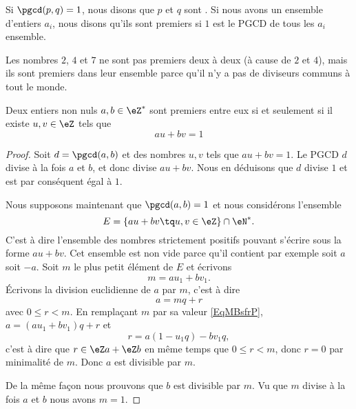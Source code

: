 \begin{definition}
    Si \( \pgcd(p,q)=1\), nous disons que \( p\) et \( q\) sont . Si nous avons un ensemble d'entiers \( a_i\), nous disons qu'ils sont premiers  si \( 1\) est le PGCD de tous les \( a_i\) ensemble.
\end{definition}

Les nombres \( 2\), \( 4\) et \( 7\) ne sont pas premiers deux à deux (à cause de \( 2\) et \( 4\)), mais ils sont premiers dans leur ensemble parce qu'il n'y a pas de diviseurs communs à tout le monde.

\begin{theorem} \label{ThoBuNjam}   
    Deux entiers non nuls \( a,b\in\eZ^*\) sont premiers entre eux si et seulement si il existe \( u,v\in\eZ\) tels que 
    \begin{equation}
        au+bv=1
    \end{equation}
\end{theorem}

\begin{proof}
    Soit \( d=\pgcd(a,b)\) et des nombres \( u,v\) tels que \( au+bv=1\). Le PGCD \( d\) divise à la fois \( a\) et \( b\), et donc divise \( au+bv\). Nous en déduisons que \( d\) divise \( 1\) et est par conséquent égal à \( 1\).

    Nous supposons maintenant que \( \pgcd(a,b)=1\) et nous considérons l'ensemble
    \begin{equation}
        E=\{ au+bv\tq u,v\in \eZ \}\cap \eN^*.
    \end{equation}
    C'est à dire l'ensemble des nombres strictement positifs pouvant s'écrire sous la forme \( au+bv\). Cet ensemble est non vide parce qu'il contient par exemple soit \( a\) soit \( -a\). Soit \( m\) le plus petit élément de \( E\) et écrivons
    \begin{equation}    \label{EqMBsfrP}
        m=au_1+bv_1.
    \end{equation}
    Écrivons la division euclidienne de \( a\) par \( m\), c'est à dire
    \begin{equation}
        a=mq+r
    \end{equation}
    avec \( 0\leq r<m\). En remplaçant \( m\) par sa valeur \eqref{EqMBsfrP}, \( a=(au_1+bv_1)q+r\) et 
    \begin{equation}
        r=a(1-u_1q)-bv_1q,
    \end{equation}
    c'est à dire que \( r\in \eZ a+\eZ b\) en même temps que \( 0\leq r<m\), donc \( r=0\) par minimalité de \( m\). Donc \( a\) est divisible par \( m\). 

    De la même façon nous prouvons que \( b\) est divisible par \( m\). Vu que \( m\) divise à la fois \( a\) et \( b\) nous avons \( m=1\).
\end{proof}

